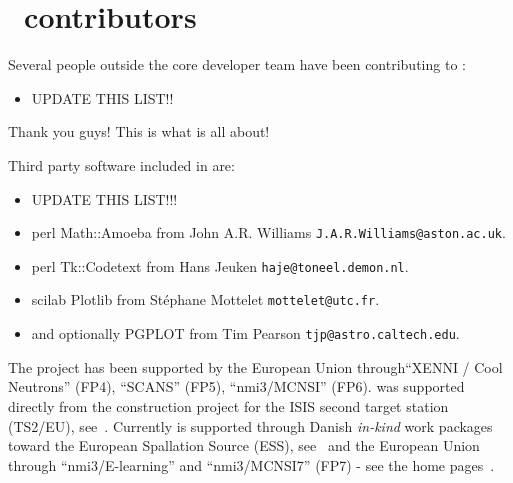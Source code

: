 \section*{\MCS \version\ contributors}
Several people outside the core developer team have been contributing
to \MCS \version:
\begin{itemize}
\item UPDATE THIS LIST!!
\end{itemize}
Thank you guys! This is what \MCS is all about!

Third party software included in \MCS are:
\begin{itemize}
\item UPDATE THIS LIST!!!
\item perl Math::Amoeba from John A.R. Williams \verb+J.A.R.Williams@aston.ac.uk+.
\item perl Tk::Codetext from Hans Jeuken \verb+haje@toneel.demon.nl+.
\item scilab Plotlib from St\'ephane Mottelet \verb+mottelet@utc.fr+.
\item and optionally PGPLOT from Tim Pearson \verb+tjp@astro.caltech.edu+.
\end{itemize}

The \MCS project has been supported by the European Union
through``XENNI / Cool Neutrons'' (FP4), ``SCANS'' (FP5),
``nmi3/MCNSI'' (FP6). \MCS was supported directly from the construction project for the ISIS second
target station (TS2/EU), see~\cite{ts2_webpage}. Currently \MCS is 
supported through Danish \emph{in-kind} work packages toward the
European Spallation Source (ESS), see~\cite{ess_webpage} and the
European Union through ``nmi3/E-learning'' and ``nmi3/MCNSI7'' (FP7) - see
the home pages~\cite{nmi3_webpage,mcnsi_webpage}.

